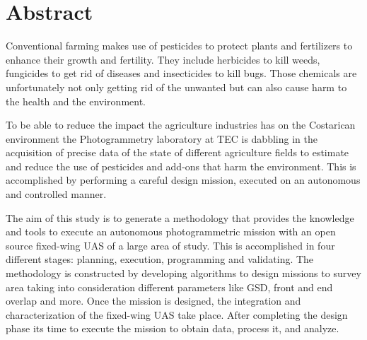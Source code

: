 \section{Abstract}
Conventional farming makes use of pesticides to protect plants and fertilizers to enhance their growth and fertility. They include herbicides to kill weeds, fungicides to get rid of diseases and insecticides to kill bugs. Those chemicals are unfortunately not only getting rid of the unwanted but can also cause harm to the health and the environment.


To be able to reduce the impact the agriculture industries has on the Costarican environment the Photogrammetry laboratory at TEC is dabbling in the acquisition of precise data of the state of different agriculture fields to estimate and reduce the use of pesticides and add-ons that harm the environment. This is accomplished by performing a careful design mission, executed on an autonomous and controlled manner.

The aim of this study is to generate a methodology that provides the knowledge and tools to execute an autonomous photogrammetric mission with an open source fixed-wing UAS of a large area of study. This is accomplished in four different stages: planning, execution, programming and validating. The methodology is constructed by developing algorithms to design missions to survey area taking into consideration different parameters like GSD, front and end overlap and more. Once the mission is designed, the integration and characterization of the fixed-wing UAS take place. After completing the design phase its time to execute the mission to obtain data,  process it, and analyze.